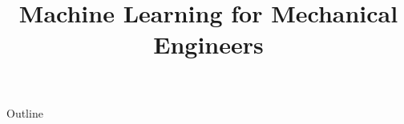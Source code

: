 \documentclass[xcolor=dvipsnames,compress,t,pdf,9pt]{beamer}
\title[\insertframenumber /\inserttotalframenumber]{Machine Learning for Mechanical Engineers}
\begin{document}
	\begin{frame}
	\titlepage
	\end{frame}

	\begin{frame}{Outline}
	    \tableofcontents
	\end{frame}

	
	
	
\end{document}
